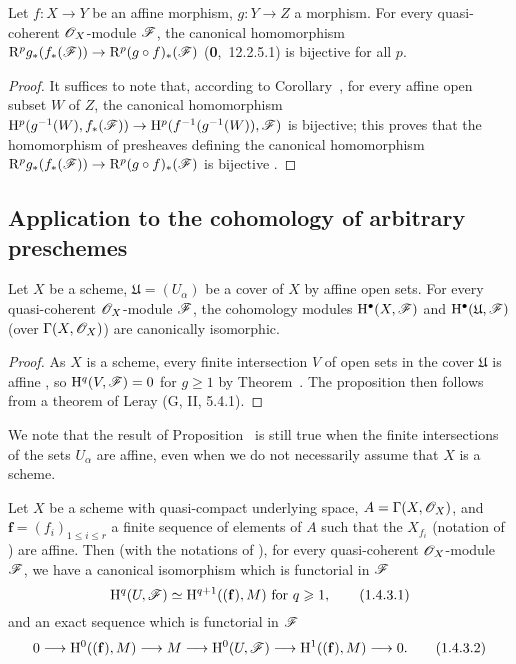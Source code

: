 \begin{corollary}[1.3.4]
\label{III.1.3.4}
Let $f:X\to Y$ be an affine morphism, $g:Y\to Z$ a morphism.
For every quasi-coherent $\mathscr{O}_X$-module $\mathscr{F}$, the canonical homomorphism $\RR^p g_*(f_*(\sh{F}))\to\RR^p(g\circ f)_*(\sh{F})$ (\textbf{0},~12.2.5.1) is bijective for all $p$.
\end{corollary}

\begin{proof}
\label{proof-III.1.3.4}
It suffices to note that, according to Corollary~, for every affine open subset $W$ of $Z$, the canonical homomorphism $\HH^p(g^{-1}(W),f_*(\sh{F}))\to\HH^p(f^{-1}(g^{-1}(W)),\sh{F})$ is bijective; this proves that the homomorphism of presheaves defining the canonical homomorphism $\RR^p g_*(f_*(\sh{F}))\to\RR^p(g\circ f)_*(\sh{F})$ is bijective .
\end{proof}

\subsection{Application to the cohomology of arbitrary preschemes}
\label{subsection:III.1.4}

\begin{proposition}[1.4.1]
\label{III.1.4.1}
Let $X$ be a scheme, $\mathfrak{U}=(U_\alpha)$ be a cover of $X$ by affine open sets.
For every quasi-coherent $\mathscr{O}_X$-module $\mathscr{F}$, the cohomology modules $\mathrm{H}^\bullet(X,\mathscr{F})$ and $\mathrm{H}^\bullet(\mathfrak{U},\mathscr{F})$ (over $\Gamma(X,\mathscr{O}_X)$) are canonically isomorphic.
\end{proposition}

\begin{proof}
\label{proof-III.1.4.1}
As $X$ is a scheme, every finite intersection $V$ of open sets in the cover $\mathfrak{U}$ is affine , so $\mathrm{H}^q(V,\mathscr{F})=0$ for $g\geq 1$ by Theorem~.
The proposition then follows from a theorem of Leray (G, II, 5.4.1).
\end{proof}

\begin{remark}[1.4.2]
\label{III.1.4.2}
We note that the result of Proposition~ is still true when the finite intersections of the sets $U_\alpha$ are affine, even when we do not necessarily assume that $X$ is a scheme.
\end{remark}

\begin{corollary}[1.4.3]
\label{III.1.4.3}
Let $X$ be a scheme with quasi-compact underlying space, $A=\Gamma(X,\mathscr{O}_X)$, and $\mathbf{f}=(f_i)_{1\leq i\leq r}$ a finite sequence of elements of $A$ such that the $X_{f_i}$ (notation of ) are affine.
Then (with the notations of ), for every quasi-coherent $\mathscr{O}_X$-module $\mathscr{F}$, we have a canonical isomorphism which is functorial in $\mathscr{F}$
\[
  \mathrm{H}^q(U,\mathscr{F})\simeq\mathrm{H}^{q+1}((\mathbf{f}),M)\text{ for }q\geqslant 1,
  \tag{1.4.3.1}
\]
and an exact sequence which is functorial in $\mathscr{F}$
\[
  0\to\HH^0((\mathbf{f}),M)\to M\to\HH^0(U,\sh{F})\to\HH^1((\mathbf{f}),M)\to 0.
  \tag{1.4.3.2}
\]
\end{corollary}

